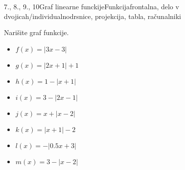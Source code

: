 \begin{priprava}{7., 8., 9., 10}{}{Graf linearne funckije}{Funkcija}{frontalna, delo v dvojicah/individualno}{drsnice, projekcija, tabla, računalniki}
        \begin{naloga}
                Narišite graf funkcije. 
                \begin{multicols}{2}
                    \begin{itemize}
                        \item $f(x)=|3x-3|$ 
                        \item $g(x)=|2x+1|+1$ 
                        \item $h(x)=1-|x+1|$ 
                        \item $i(x)=3-|2x-1|$ 
                        \item $j(x)=x+|x-2|$ 
                        \item $k(x)=|x+1|-2$ 
                        \item $l(x)=-|0.5x+3|$ 
                        \item $m(x)=3-|x-2|$ 
                    \end{itemize}
                \end{multicols}
        \end{naloga}




\end{priprava}